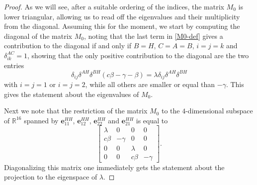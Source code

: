 \documentclass[10pt,a4paper]{amsart}
\begin{document}
\begin{proof}
As we will see, after a suitable ordering of the indices, the matrix $M_0$ is lower triangular, allowing us to read off the eigenvalues and their multiplicity from the diagonal.  Assuming this for the moment, we start by computing the diagonal of the matrix $M_0$,
noting that the last term in \eqref{M0-def} gives a contribution to the diagonal if and only if 
$B=H$,
$C=A=B$, $i=j=k$ and
 $\delta_{ik}^{AC}=1$, showing that the only positive contribution to the diagonal are the two entries
$$
\delta_{ij}\delta^{AH}\delta^{BH} (c\beta-\gamma-\beta)=\lambda \delta_{ij}\delta^{AH}\delta^{BH} 
$$
with $i=j=1$ or $i=j=2$, while all others are smaller or equal than $-\gamma$.  This gives the statement about the eigenvalues of $M_0$.

Next we note that 
the restriction of  the matrix $M_0$ 
to the $4$-dimensional subspace of $\mathbb R^{16}$ spanned by 
  $\mathbf e_{11}^{HH}$,   $\mathbf e_{12}^{HH}$,   $\mathbf e_{22}^{HH}$ and  $\mathbf e_{21}^{HH}$ is equal to
  $$
\begin{bmatrix}
    \lambda&0&0&0\\
    c\beta&-\gamma&0&0\\
    0&0&\lambda&0\\
    0&0&c\beta&-\gamma
\end{bmatrix}.
  $$
Diagonalizing this matrix one immediately gets the statement about the projection to the eigenspace of $\lambda$.


\end{proof}
\end{document}
